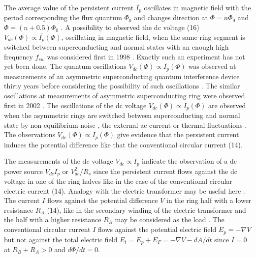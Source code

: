 \documentclass[twocolumn,secnumarabic,amssymb, nobibnotes, aps, prd]{revtex4}
\begin{document}
The average value of the persistent current $\overline{I_{p}}$ oscillates in magnetic field with the period corresponding the flux quantum $\Phi_{0}$ and changes direction at  $\Phi = n\Phi_{0}$ and $\Phi = (n+0.5)\Phi_{0}$ \cite{PC2007}. A possibility to observed the dc voltage (16)  $V _{dc}(\Phi ) \propto \overline{I_{p}}(\Phi )$, oscillating in magnetic field, when the same ring segment is switched between superconducting and normal states with an enough high frequency $f _{sw}$ was considered first in 1998 \cite{LTP1998}. Exactly such an experiment has not yet been done. The quantum oscillations $V _{dc}(\Phi ) \propto \overline{I_{p}}(\Phi )$ was observed at measurements of an asymmetric superconducting quantum interference device \cite{Physica1967} thirty years before considering the possibility of such oscillations \cite{LTP1998}. The similar oscillations at measurements of asymmetric superconducting ring were observed first in 2002 \cite{NANO2002}. The oscillations of the dc voltage $V _{dc}(\Phi ) \propto \overline{I_{p}}(\Phi )$ are observed when the asymmetric rings are switched between superconducting and normal state by non-equilibrium noise \cite{Letter2007,Physica1967,NANO2002,APL2016,Kulik75}, the external ac current \cite{Letter2003,JETP2007} or thermal fluctuations \cite{PLA2012Ex}. The observations $V _{dc}(\Phi ) \propto \overline{I_{p}}(\Phi )$ \cite{Physica2019,PLA2012Ex,Letter2007,JETP2007,Letter2003,Physica1967,NANO2002,APL2016,Kulik75} give evidence that the persistent current induces the potential difference like that the conventional circular current (14).   

The measurements \cite{Physica2019,PLA2012Ex,Letter2007,JETP2007,Letter2003,Physica1967,NANO2002,APL2016,Kulik75} of the dc voltage $V_{dc} \propto I_{p}$ indicate the observation of a dc power source $V_{dc}I_{p}$ or $V_{dc}^{2}/R_{s}$ since the persistent current flows against the dc voltage in one of the ring halves \cite{QuanStud2016} like in the case of the conventional circular electric current (14). Analogy with the electric transformer may be useful here \cite{Physica2019}. The current $I$ flows against the potential difference $V $ in the ring half with a lower resistance $R_{A}$ (14), like in the secondary winding of the electric transformer and the half with a higher resistance $R_{B}$ may be considered as the load \cite{Physica2019}. The conventional circular current $I$ flows against the potential electric field $E_{p} = -\nabla V$ but not against the total electric field $E_{t} = E_{p} + E_{F} =  -\nabla V - dA/dt$ since $I = 0$ at $R_{B} + R_{A} > 0$ and $d\Phi /dt = 0$. 
\end{document}
